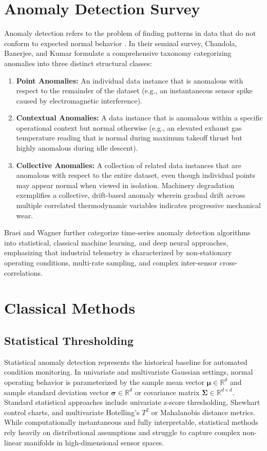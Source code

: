 \documentclass[12pt,a4paper,oneside]{report}
\begin{document}
\section{Anomaly Detection Survey}
Anomaly detection refers to the problem of finding patterns in data that do not conform to expected normal behavior \cite{chandola2009anomaly}. In their seminal survey, Chandola, Banerjee, and Kumar formulate a comprehensive taxonomy categorizing anomalies into three distinct structural classes:
\begin{enumerate}
    \item \textbf{Point Anomalies:} An individual data instance that is anomalous with respect to the remainder of the dataset (e.g., an instantaneous sensor spike caused by electromagnetic interference).
    \item \textbf{Contextual Anomalies:} A data instance that is anomalous within a specific operational context but normal otherwise (e.g., an elevated exhaust gas temperature reading that is normal during maximum takeoff thrust but highly anomalous during idle descent).
    \item \textbf{Collective Anomalies:} A collection of related data instances that are anomalous with respect to the entire dataset, even though individual points may appear normal when viewed in isolation. Machinery degradation exemplifies a collective, drift-based anomaly wherein gradual drift across multiple correlated thermodynamic variables indicates progressive mechanical wear.
\end{enumerate}

Braei and Wagner \cite{braei2020anomaly} further categorize time-series anomaly detection algorithms into statistical, classical machine learning, and deep neural approaches, emphasizing that industrial telemetry is characterized by non-stationary operating conditions, multi-rate sampling, and complex inter-sensor cross-correlations.

\section{Classical Methods}
\subsection{Statistical Thresholding}
Statistical anomaly detection represents the historical baseline for automated condition monitoring. In univariate and multivariate Gaussian settings, normal operating behavior is parameterized by the sample mean vector $\boldsymbol{\mu} \in \mathbb{R}^d$ and sample standard deviation vector $\boldsymbol{\sigma} \in \mathbb{R}^d$ or covariance matrix $\boldsymbol{\Sigma} \in \mathbb{R}^{d \times d}$. Standard statistical approaches include univariate z-score thresholding, Shewhart control charts, and multivariate Hotelling's $T^2$ or Mahalanobis distance metrics. While computationally instantaneous and fully interpretable, statistical methods rely heavily on distributional assumptions and struggle to capture complex non-linear manifolds in high-dimensional sensor spaces.
\end{document}
